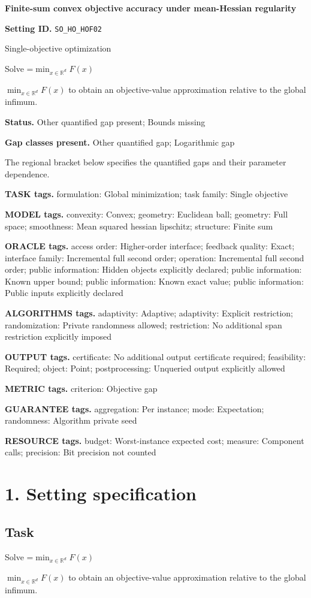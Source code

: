 \documentclass[10pt,a4paper]{article}
\newcommand{\AtlasMath}[1]{\par\begingroup\centering\setbox0=\hbox{$\displaystyle #1$}\ifdim\wd0>1.4\linewidth\typeout{ATLAS WIDE FORMULA: \the\wd0}\fi\ifdim\wd0>\linewidth\resizebox{\linewidth}{!}{\box0}\else\box0\fi\par\endgroup}
\newcommand{\AtlasInlineMath}[1]{\begingroup\setbox0=\hbox{$#1$}\ifdim\wd0>.4\linewidth\endgroup\AtlasMath{#1}\else\endgroup$#1$\fi}
\begin{document}
\raggedright

{\LARGE\bfseries\sffamily\color{AtlasNavy} Finite-sum convex objective accuracy under mean-Hessian regularity\par}\vspace{5pt}
\textbf{Setting ID.} \texttt{SO\_\allowbreak{}HO\_\allowbreak{}HOF02}

Single-objective optimization

Solve \AtlasInlineMath{\min_{x\in \mathbb{R}^d}F(x)} to obtain an objective-value approximation relative to the global infimum.

\textbf{Status.} Other quantified gap present; Bounds missing

\textbf{Gap classes present.} Other quantified gap; Logarithmic gap

The regional bracket below specifies the quantified gaps and their parameter dependence.

\textbf{TASK tags.} formulation: Global minimization; task family: Single objective

\textbf{MODEL tags.} convexity: Convex; geometry: Euclidean ball; geometry: Full space; smoothness: Mean squared hessian lipschitz; structure: Finite sum

\textbf{ORACLE tags.} access order: Higher-order interface; feedback quality: Exact; interface family: Incremental full second order; operation: Incremental full second order; public information: Hidden objects explicitly declared; public information: Known upper bound; public information: Known exact value; public information: Public inputs explicitly declared

\textbf{ALGORITHMS tags.} adaptivity: Adaptive; adaptivity: Explicit restriction; randomization: Private randomness allowed; restriction: No additional span restriction explicitly imposed

\textbf{OUTPUT tags.} certificate: No additional output certificate required; feasibility: Required; object: Point; postprocessing: Unqueried output explicitly allowed

\textbf{METRIC tags.} criterion: Objective gap

\textbf{GUARANTEE tags.} aggregation: Per instance; mode: Expectation; randomness: Algorithm private seed

\textbf{RESOURCE tags.} budget: Worst-instance expected cost; measure: Component calls; precision: Bit precision not counted

\section{1. Setting specification}
\subsection{Task}
Solve \AtlasInlineMath{\min_{x\in \mathbb{R}^d}F(x)} to obtain an objective-value approximation relative to the global infimum.
\end{document}
